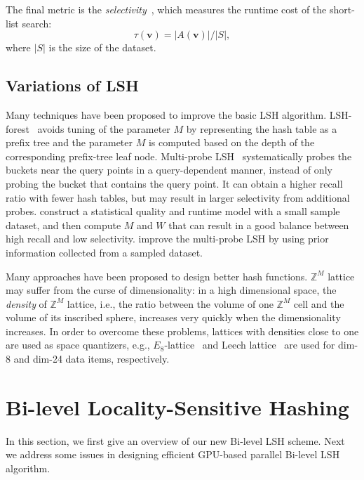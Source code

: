 The final metric is the \emph{selectivity}~\cite{Dong:2008:MLP}, which measures the runtime cost of the short-list search:
\begin{equation}
\label{eq:6:selectivity}
\tau(\mathbf v) = |A(\mathbf v)| / |S|,
\end{equation}
where $|S|$ is the size of the dataset.

\subsection{Variations of LSH}
Many techniques have been proposed to improve the basic LSH algorithm. LSH-forest~\cite{Bawa:2005:LFS} avoids tuning of the parameter $M$ by representing the hash table as a prefix tree and the parameter $M$ is computed based on the depth of the corresponding prefix-tree leaf node. Multi-probe LSH~\cite{Lv:2007:MLE} systematically probes the buckets near the query points in a query-dependent manner, instead of only probing the bucket that contains the query point. It can obtain a higher recall ratio with fewer hash tables, but may result in larger selectivity from additional probes. \cite{Dong:2008:MLP} construct a statistical quality and runtime model with a small sample dataset, and then compute $M$ and $W$ that can result in a good balance between high recall and low selectivity. \cite{Joly:2008:PML} improve the multi-probe LSH by using prior information collected from a sampled dataset.

Many approaches have been proposed to design better hash functions. $\mathbb Z^M$ lattice may suffer from the curse of dimensionality: in a high dimensional space, the \emph{density} of $\mathbb Z^M$ lattice, i.e., the ratio between the volume of one $\mathbb Z^M$ cell and the volume of its inscribed sphere, increases very quickly when the dimensionality increases. In order to overcome these problems, lattices with densities close to one are used as space quantizers, e.g., $E_8$-lattice~\cite{Jegou:2008} and Leech lattice~\cite{Andoni:2006:NHA} are used for dim-8 and dim-24 data items, respectively.




\section{Bi-level Locality-Sensitive Hashing}
\label{sec:6:overview}

In this section, we first give an overview of our new Bi-level LSH scheme. Next we address some issues in designing efficient GPU-based parallel Bi-level LSH algorithm.

